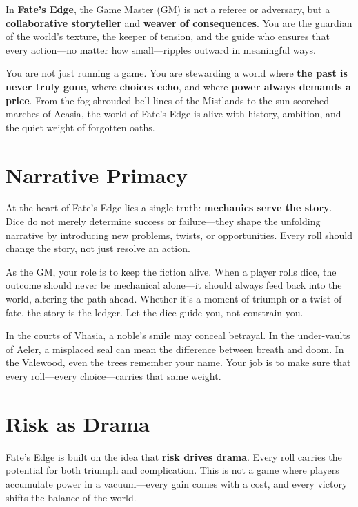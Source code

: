 In \textbf{Fate's Edge}, the Game Master (GM) is not a referee or adversary, but a \textbf{collaborative storyteller} and \textbf{weaver of consequences}. You are the guardian of the world's texture, the keeper of tension, and the guide who ensures that every action---no matter how small---ripples outward in meaningful ways.

You are not just running a game. You are stewarding a world where \textbf{the past is never truly gone}, where \textbf{choices echo}, and where \textbf{power always demands a price}. From the fog-shrouded bell-lines of the Mistlands to the sun-scorched marches of Acasia, the world of Fate's Edge is alive with history, ambition, and the quiet weight of forgotten oaths.

\section*{Narrative Primacy}

At the heart of Fate's Edge lies a single truth: \textbf{mechanics serve the story}. Dice do not merely determine success or failure---they shape the unfolding narrative by introducing new problems, twists, or opportunities. Every roll should change the story, not just resolve an action.

As the GM, your role is to keep the fiction alive. When a player rolls dice, the outcome should never be mechanical alone---it should always feed back into the world, altering the path ahead. Whether it's a moment of triumph or a twist of fate, the story is the ledger. Let the dice guide you, not constrain you.

In the courts of Vhasia, a noble's smile may conceal betrayal. In the under-vaults of Aeler, a misplaced seal can mean the difference between breath and doom. In the Valewood, even the trees remember your name. Your job is to make sure that every roll---every choice---carries that same weight.

\section*{Risk as Drama}

Fate's Edge is built on the idea that \textbf{risk drives drama}. Every roll carries the potential for both triumph and complication. This is not a game where players accumulate power in a vacuum---every gain comes with a cost, and every victory shifts the balance of the world.


